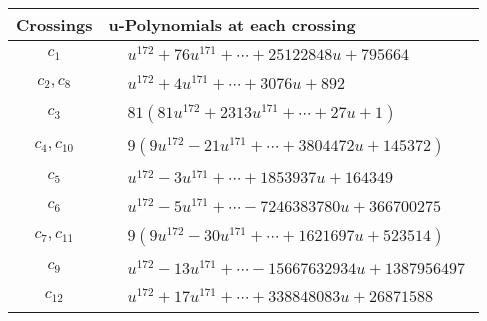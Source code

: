 \documentclass[1p]{elsarticle_modified}
\theoremstyle{definition}
\begin{document}
\begin{tabular}{m{50pt}|m{274pt}}
Crossings & \hspace{64pt}u-Polynomials at each crossing \\
\hline $$\begin{aligned}c_{1}\end{aligned}$$&$\begin{aligned}
&u^{172}+76 u^{171}+\cdots+25122848 u+795664
\end{aligned}$\\
\hline $$\begin{aligned}c_{2},c_{8}\end{aligned}$$&$\begin{aligned}
&u^{172}+4 u^{171}+\cdots+3076 u+892
\end{aligned}$\\
\hline $$\begin{aligned}c_{3}\end{aligned}$$&$\begin{aligned}
&81(81 u^{172}+2313 u^{171}+\cdots+27 u+1)
\end{aligned}$\\
\hline $$\begin{aligned}c_{4},c_{10}\end{aligned}$$&$\begin{aligned}
&9(9 u^{172}-21 u^{171}+\cdots+3804472 u+145372)
\end{aligned}$\\
\hline $$\begin{aligned}c_{5}\end{aligned}$$&$\begin{aligned}
&u^{172}-3 u^{171}+\cdots+1853937 u+164349
\end{aligned}$\\
\hline $$\begin{aligned}c_{6}\end{aligned}$$&$\begin{aligned}
&u^{172}-5 u^{171}+\cdots-7246383780 u+366700275
\end{aligned}$\\
\hline $$\begin{aligned}c_{7},c_{11}\end{aligned}$$&$\begin{aligned}
&9(9 u^{172}-30 u^{171}+\cdots+1621697 u+523514)
\end{aligned}$\\
\hline $$\begin{aligned}c_{9}\end{aligned}$$&$\begin{aligned}
&u^{172}-13 u^{171}+\cdots-15667632934 u+1387956497
\end{aligned}$\\
\hline $$\begin{aligned}c_{12}\end{aligned}$$&$\begin{aligned}
&u^{172}+17 u^{171}+\cdots+338848083 u+26871588
\end{aligned}$\\
\hline
\end{tabular}\\~\\
\end{document}
